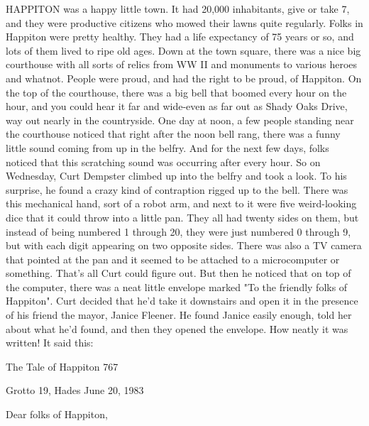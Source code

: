 HAPPITON was a happy little town. It had 20,000 inhabitants, give or take 7,
and they were productive citizens who mowed their lawns quite regularly. Folks in
Happiton were pretty healthy. They had a life expectancy of 75 years or so, and lots of
them lived to ripe old ages. Down at the town square, there was a nice big courthouse
with all sorts of relics from WW II and monuments to various heroes and whatnot.
People were proud, and had the right to be proud, of Happiton.
        On the top of the courthouse, there was a big bell that boomed every hour on
the hour, and you could hear it far and wide-even as far out as Shady Oaks Drive, way
out nearly in the countryside.
        One day at noon, a few people standing near the courthouse noticed that right
after the noon bell rang, there was a funny little sound coming from up in the belfry.
And for the next few days, folks noticed that this scratching sound was occurring after
every hour. So on Wednesday, Curt Dempster climbed up into the belfry and took a
look. To his surprise, he found a crazy kind of contraption rigged up to the bell. There
was this mechanical hand, sort of a robot arm, and next to it were five weird-looking
dice that it could throw into a little pan. They all had twenty sides on them, but
instead of being numbered 1 through 20, they were just numbered 0 through 9, but
with each digit appearing on two opposite sides. There was also a TV camera that
pointed at the pan and it seemed to be attached to a microcomputer or something.
That's all Curt could figure out. But then he noticed that on top of the computer, there
was a neat little envelope marked "To the friendly folks of Happiton". Curt decided
that he'd take it downstairs and open it in the presence of his friend the mayor, Janice
Fleener. He found Janice easily enough, told her about what he'd found, and then they
opened the envelope. How neatly it was written! It said this:




The Tale of Happiton                                                                767

                                                                        Grotto 19, Hades
                                                                          June 20, 1983

Dear folks of Happiton,

